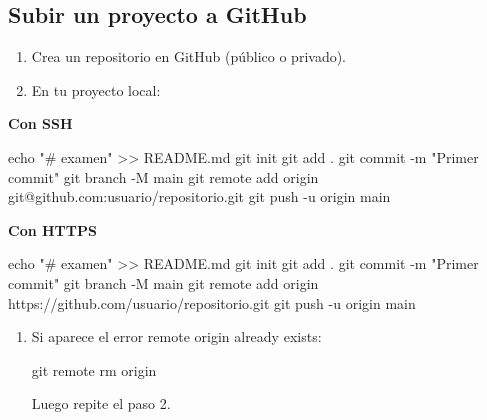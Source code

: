 \documentclass[
  doc,
  floatsintext,
  longtable,
  a4paper,
  nolmodern,
  notxfonts,
  notimes,
  colorlinks=true,linkcolor=blue,citecolor=blue,urlcolor=blue]{apa7}
\newenvironment{Shaded}{\begin{snugshade}}{\end{snugshade}}
\newcommand{\AttributeTok}[1]{\textcolor[rgb]{0.40,0.45,0.13}{#1}}
\newcommand{\BuiltInTok}[1]{\textcolor[rgb]{0.00,0.23,0.31}{#1}}
\newcommand{\FunctionTok}[1]{\textcolor[rgb]{0.28,0.35,0.67}{#1}}
\newcommand{\NormalTok}[1]{\textcolor[rgb]{0.00,0.23,0.31}{#1}}
\newcommand{\OperatorTok}[1]{\textcolor[rgb]{0.37,0.37,0.37}{#1}}
\newcommand{\StringTok}[1]{\textcolor[rgb]{0.13,0.47,0.30}{#1}}
\begin{document}
\subsection{Subir un proyecto a
GitHub}\label{subir-un-proyecto-a-github}

\begin{enumerate}
\def\labelenumi{\arabic{enumi}.}
\item
  Crea un repositorio en GitHub (público o privado).
\item
  En tu proyecto local:
\end{enumerate}

\textbf{Con SSH}

\begin{Shaded}
\begin{Highlighting}[]
\BuiltInTok{echo} \StringTok{"\# examen"} \OperatorTok{\textgreater{}\textgreater{}}\NormalTok{ README.md}
\FunctionTok{git}\NormalTok{ init}
\FunctionTok{git}\NormalTok{ add .}
\FunctionTok{git}\NormalTok{ commit }\AttributeTok{{-}m} \StringTok{"Primer commit"}
\FunctionTok{git}\NormalTok{ branch }\AttributeTok{{-}M}\NormalTok{ main}
\FunctionTok{git}\NormalTok{ remote add origin git@github.com:usuario/repositorio.git}
\FunctionTok{git}\NormalTok{ push }\AttributeTok{{-}u}\NormalTok{ origin main}
\end{Highlighting}
\end{Shaded}

\textbf{Con HTTPS}

\begin{Shaded}
\begin{Highlighting}[]
\BuiltInTok{echo} \StringTok{"\# examen"} \OperatorTok{\textgreater{}\textgreater{}}\NormalTok{ README.md}
\FunctionTok{git}\NormalTok{ init}
\FunctionTok{git}\NormalTok{ add .}
\FunctionTok{git}\NormalTok{ commit }\AttributeTok{{-}m} \StringTok{"Primer commit"}
\FunctionTok{git}\NormalTok{ branch }\AttributeTok{{-}M}\NormalTok{ main}
\FunctionTok{git}\NormalTok{ remote add origin https://github.com/usuario/repositorio.git}
\FunctionTok{git}\NormalTok{ push }\AttributeTok{{-}u}\NormalTok{ origin main}
\end{Highlighting}
\end{Shaded}

\begin{enumerate}
\def\labelenumi{\arabic{enumi}.}
\setcounter{enumi}{2}
\item
  Si aparece el error remote origin already exists:

\begin{Shaded}
\begin{Highlighting}[]
\FunctionTok{git}\NormalTok{ remote rm origin}
\end{Highlighting}
\end{Shaded}

  Luego repite el paso 2.
\end{enumerate}
\end{document}
